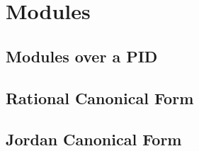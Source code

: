 \section{Modules} 

\subsection{Modules over a PID} 

\subsection{Rational Canonical Form}

\subsection{Jordan Canonical Form}

